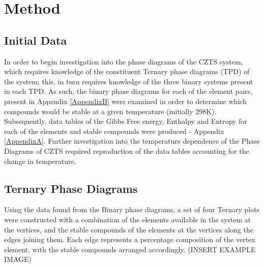 
\chapter{Method} %

\label{Chapter2} %



\section{Initial Data}

In order to begin investigation into the phase diagrams of the CZTS system, which requires knowledge of the constituent Ternary phase diagrams (TPD) of the system; this, in turn requires knowledge of the three binary systems present in each TPD. As such, the binary phase diagrams for each of the element pairs, present in Appendix \ref{AppendixB} were examined in order to determine which compounds would be stable at a given temperature (initially 298K). Subsequently, data tables of the Gibbs Free energy, Enthalpy and Entropy for each of the elements and stable compounds were produced - Appendix \ref{AppendixA}. Further investigation into the temperature dependence of the Phase Diagrams of CZTS required reproduction of the data tables accounting for the change in temperature. 


\section{Ternary Phase Diagrams}

Using the data found from the Binary phase diagrams, a set of four Ternary plots were constructed with a combination of the elements available in the system at the vertices, and the stable compounds of the elements at the vertices along the edges joining them. Each edge represents a percentage composition of the vertex element, with the stable compounds arranged accordingly. (INSERT EXAMPLE IMAGE)

